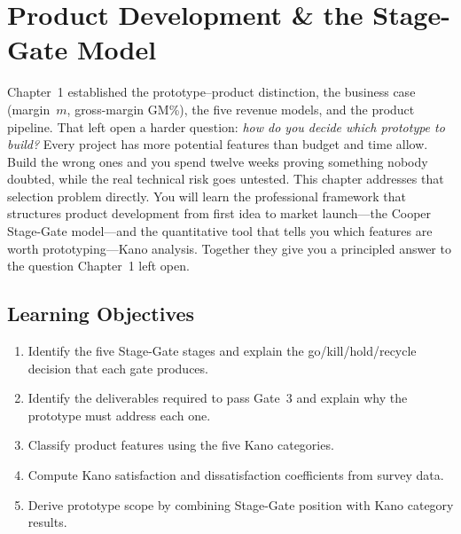 
\chapter{Product Development \& the Stage-Gate Model}
\label{ch:stagegate}

Chapter~1 established the prototype--product distinction, the business
case (margin~$m$, gross-margin GM\%), the five revenue models, and the
product pipeline.
That left open a harder question: \emph{how do you decide which prototype
to build?}
Every project has more potential features than budget and time allow.
Build the wrong ones and you spend twelve weeks proving something nobody
doubted, while the real technical risk goes untested.
This chapter addresses that selection problem directly.
You will learn the professional framework that structures product
development from first idea to market launch---the Cooper Stage-Gate
model---and the quantitative tool that tells you which features are worth
prototyping---Kano analysis.
Together they give you a principled answer to the question Chapter~1 left
open.

\section*{Learning Objectives}
\begin{enumerate}
  \item Identify the five Stage-Gate stages and explain the go/kill/hold/recycle decision that each gate produces.
  \item Identify the deliverables required to pass Gate~3 and explain why the prototype must address each one.
  \item Classify product features using the five Kano categories.
  \item Compute Kano satisfaction and dissatisfaction coefficients from
        survey data.
  \item Derive prototype scope by combining Stage-Gate position with
        Kano category results.
\end{enumerate}

